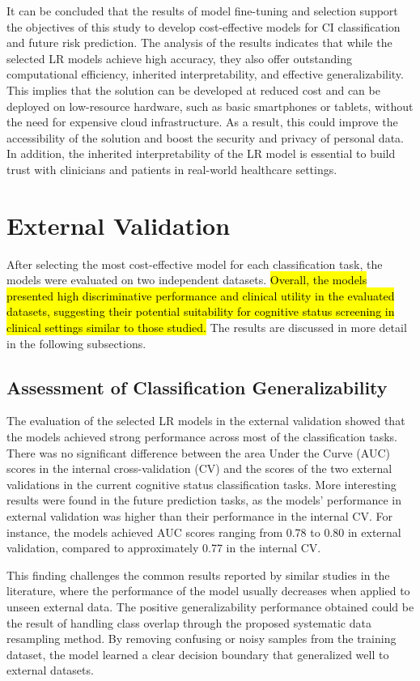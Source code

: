 It can be concluded that the results of model fine-tuning and selection support the objectives of this study to develop cost-effective models for CI classification and future risk prediction. The analysis of the results indicates that while the selected LR models achieve high accuracy, they also offer outstanding computational efficiency, inherited interpretability, and effective generalizability. This implies that the solution can be developed at reduced cost and can be deployed on low-resource hardware, such as basic smartphones or tablets, without the need for expensive cloud infrastructure. As a result, this could improve the accessibility of the solution and boost the security and privacy of personal data. In addition, the inherited interpretability of the LR model is essential to build trust with clinicians and patients in real-world healthcare settings.

\section{External Validation}
After selecting the most cost-effective model for each classification task, the models were evaluated on two independent datasets. \hl{Overall, the models presented high discriminative performance and clinical utility in the evaluated datasets, suggesting their potential suitability for cognitive status screening in clinical settings similar to those studied.} The results are discussed in more detail in the following subsections.

\subsection{Assessment of Classification Generalizability}
The evaluation of the selected LR models in the external validation showed that the models achieved strong performance across most of the classification tasks. There was no significant difference between the area Under the Curve (\acrshort{AUC}) scores in the internal cross-validation (CV) and the scores of the two external validations in the current cognitive status classification tasks. More interesting results were found in the future prediction tasks, as the models' performance in external validation was higher than their performance in the internal CV. For instance, the models achieved AUC scores ranging from 0.78 to 0.80 in external validation, compared to approximately 0.77 in the internal CV.

This finding challenges the common results reported by similar studies in the literature, where the performance of the model usually decreases when applied to unseen external data. The positive generalizability performance obtained could be the result of handling class overlap through the proposed systematic data resampling method. By removing confusing or noisy samples from the training dataset, the model learned a clear decision boundary that generalized well to external datasets.

